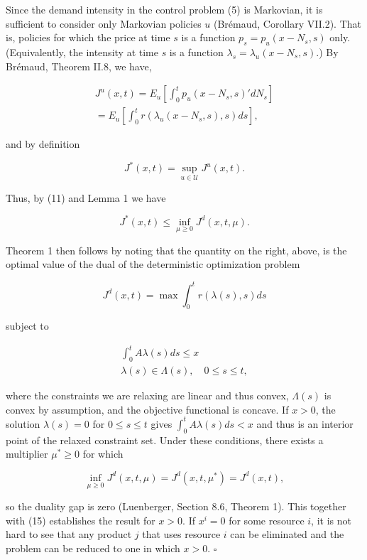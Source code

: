 Since the demand intensity in the control problem (5) is Markovian, it is sufficient to consider only Markovian policies \(u\) (Brémaud, Corollary VII.2). That is, policies for which the price at time \(s\) is a function \(p_s = p_u(x - N_s, s)\) only. (Equivalently, the intensity at time \(s\) is a function \(\lambda_s = \lambda_u(x - N_s, s).\)) By Brémaud, Theorem II.8, we have,

\[
\begin{array}{c}
J^u(x, t) = E_u \left[ \int_{0}^{t} p_u(x - N_s, s)' dN_s \right] \\
= E_u \left[ \int_{0}^{t} r(\lambda_u(x - N_s, s), s) ds \right],
\end{array}
\]

and by definition

\[
J^*(x, t) = \operatorname*{sup}_{u \in \mathcal{U}} J^u(x, t).
\]

Thus, by (11) and Lemma 1 we have

\[
J^*(x, t) \leqslant \inf_{\mu \geqslant 0} J^d(x, t, \mu).
\]

Theorem 1 then follows by noting that the quantity on the right, above, is the optimal value of the dual of the deterministic optimization problem

\[
J^d(x, t) = \operatorname*{max} \int_{0}^{t} r(\lambda(s), s)  ds
\]

subject to

\[
\begin{array}{l}
\displaystyle \int_{0}^{t} A \lambda(s)  ds \leqslant x \\
\displaystyle \lambda(s) \in \Lambda(s), \quad 0 \leqslant s \leqslant t,
\end{array}
\]

where the constraints we are relaxing are linear and thus convex, \(\Lambda(s)\) is convex by assumption, and the objective functional is concave. If \(x > 0\), the solution \(\lambda(s) = 0\) for \(0 \leqslant s \leqslant t\) gives \(\int_{0}^{t} A \lambda(s) ds < x\) and thus is an interior point of the relaxed constraint set. Under these conditions, there exists a multiplier \(\mu^* \geqslant 0\) for which

\[
\inf_{\mu \geqslant 0} J^d(x, t, \mu) = J^d(x, t, \mu^*) = J^d(x, t),
\]

so the duality gap is zero (Luenberger, Section 8.6, Theorem 1). This together with (15) establishes the result for \(x > 0\). If \(x^i = 0\) for some resource \(i\), it is not hard to see that any product \(j\) that uses resource \(i\) can be eliminated and the problem can be reduced to one in which \(x > 0\). \(\square\)


